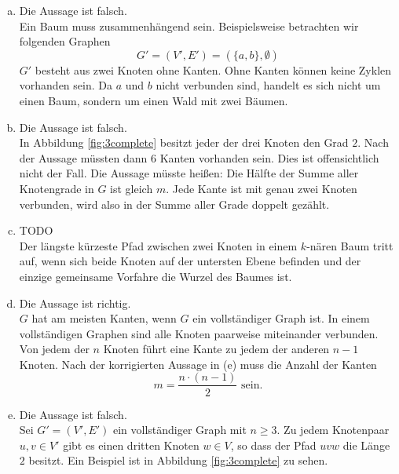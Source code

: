 \documentclass[a4paper]{scrartcl}
\begin{document}
\begin{enumerate}[(a)]
    \item
        Die Aussage ist falsch. \\
        Ein Baum muss zusammenhängend sein.
        Beispielsweise betrachten wir folgenden Graphen
        \begin{equation}
            G' = (V', E') = (\{a, b\}, \emptyset)
        \end{equation}
        $G'$ besteht aus zwei Knoten ohne Kanten.
        Ohne Kanten können keine Zyklen vorhanden sein.
        Da $a$ und $b$ nicht verbunden sind, handelt es sich nicht um einen
        Baum, sondern um einen Wald mit zwei Bäumen.

    \item
        Die Aussage ist falsch. \\
        In Abbildung \ref{fig:3complete} besitzt jeder der drei Knoten den Grad
        $2$.
        Nach der Aussage müssten dann $6$ Kanten vorhanden sein.
        Dies ist offensichtlich nicht der Fall.
        Die Aussage müsste heißen: Die Hälfte der Summe aller Knotengrade in $G$
        ist gleich $m$.
        Jede Kante ist mit genau zwei Knoten verbunden, wird also in der Summe
        aller Grade doppelt gezählt.

    \item
        TODO \\
        Der längste kürzeste Pfad zwischen zwei Knoten in einem $k$-nären Baum
        tritt auf, wenn sich beide Knoten auf der untersten Ebene befinden und
        der einzige gemeinsame Vorfahre die Wurzel des Baumes ist.

    \item
        Die Aussage ist richtig. \\
        $G$ hat am meisten Kanten, wenn $G$ ein vollständiger Graph ist.
        In einem vollständigen Graphen sind alle Knoten paarweise miteinander
        verbunden.
        Von jedem der $n$ Knoten führt eine Kante zu jedem der anderen $n-1$
        Knoten.
        Nach der korrigierten Aussage in (e) muss die Anzahl der Kanten
        \begin{equation}
            m = \frac{n \cdot (n-1)}{2} \text{ sein.}
        \end{equation}
        

    \item
        Die Aussage ist falsch. \\
        Sei $G' = (V', E')$ ein vollständiger Graph mit $n \geq 3$.
        Zu jedem Knotenpaar $u,v \in V'$ gibt es  einen dritten Knoten
        $w \in V$, so dass der Pfad $uvw$ die Länge $2$ besitzt.
        Ein Beispiel ist in Abbildung \ref{fig:3complete} zu sehen.


\end{enumerate}
\end{document}
